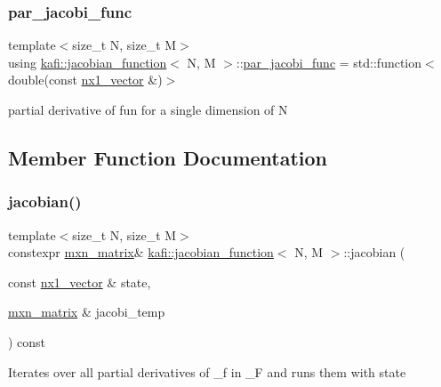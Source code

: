 \subsubsection{\texorpdfstring{par\+\_\+jacobi\+\_\+func}{par\_jacobi\_func}}
{\footnotesize\ttfamily template$<$size\+\_\+t N, size\+\_\+t M$>$ \\
using \hyperlink{classkafi_1_1jacobian__function}{kafi\+::jacobian\+\_\+function}$<$ N, M $>$\+::\hyperlink{classkafi_1_1jacobian__function_a4133d937d8f1d502de7424cb1f4f4e36}{par\+\_\+jacobi\+\_\+func} =  std\+::function$<$double(const \hyperlink{classkafi_1_1jacobian__function_ad7e7a8fbfa3e2785798bd46e5307ca65}{nx1\+\_\+vector} \&)$>$}

partial derivative of fun for a single dimension of {\ttfamily N} 

\subsection{Member Function Documentation}
\mbox{\label{classkafi_1_1jacobian__function_a769dbc859c0bbc91f2104e31a81b86aa}} 
\subsubsection{\texorpdfstring{jacobian()}{jacobian()}}
{\footnotesize\ttfamily template$<$size\+\_\+t N, size\+\_\+t M$>$ \\
constexpr \hyperlink{classkafi_1_1jacobian__function_afdc859dfbc351b172814b235b577413f}{mxn\+\_\+matrix}\& \hyperlink{classkafi_1_1jacobian__function}{kafi\+::jacobian\+\_\+function}$<$ N, M $>$\+::jacobian (\begin{DoxyParamCaption}\item[{const \hyperlink{classkafi_1_1jacobian__function_ad7e7a8fbfa3e2785798bd46e5307ca65}{nx1\+\_\+vector} \&}]{state,  }\item[{\hyperlink{classkafi_1_1jacobian__function_afdc859dfbc351b172814b235b577413f}{mxn\+\_\+matrix} \&}]{jacobi\+\_\+temp }\end{DoxyParamCaption}) const\hspace{0.3cm}{\ttfamily [inline]}}



Iterates over all partial derivatives of {\ttfamily \+\_\+f} in {\ttfamily \+\_\+F} and runs them with {\ttfamily state} 

